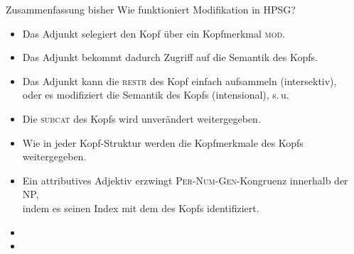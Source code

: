 \begin{frame}
  {Zusammenfassung bisher}
  \onslide<+->
  \onslide<+->
  Wie funktioniert Modifikation in HPSG?\\
 \Viertelzeile 
  \begin{itemize}[<+->]
    \item Das \alert{Adjunkt selegiert den Kopf} über ein Kopfmerkmal \textsc{mod}.\\
    \item Das Adjunkt bekommt dadurch \alert{Zugriff auf die Semantik} des Kopfs.
    \item Das Adjunkt kann die \textsc{restr} des Kopf einfach aufsammeln (intersektiv),\\
          oder es modifiziert die Semantik des Kopfs (intensional), s.\,u.
    \item Die \alert{\textsc{subcat} des Kopfs} wird unverändert weitergegeben.\\
    \item Wie in jeder Kopf-Struktur werden die Kopfmerkmale des Kopfs weitergegeben.\\
    \item Ein attributives Adjektiv erzwingt \alert{\textsc{Per-Num-Gen}-Kongruenz innerhalb der NP},\\
      indem es seinen Index mit dem des Kopfs identifiziert.
      \Halbzeile
    \item {}
    \item {}
  \end{itemize}
\end{frame}

